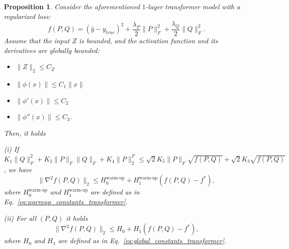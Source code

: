 \documentclass[a4paper,11pt]{article}
\newcommand{\1}{\mathbbm{1}}
\theoremstyle{plain}
\newtheorem{proposition}[theorem]{Proposition}
\begin{document}


\begin{proposition}
\label{prop:transformer_one_task}
    Consider the aforementioned $1$-layer transformer model with a regularized loss:
\begin{equation*}
    f(P,Q) = (\hat{y} - y_{true})^2 + \frac{\lambda_P}{2} \|P\|_F^2 + \frac{\lambda_Q}{2} \|Q\|_F^2.
\end{equation*}
Assume that the input $Z$ is bounded, and the activation function and its derivatives are globally bounded:
\begin{itemize}
    \item $\|Z\|_2 \leq C_Z$
    \item $\|\phi(x)\| \leq C_1 \|x\|$
    \item $\|\phi'(x)\| \leq C_2$
    \item $\|\phi''(x)\| \leq C_3$.
\end{itemize}
Then, it holds

(i) If $K_1 \|Q\|_F^2 + K_2 \|P\|_F \|Q\|_F + K_4 \|P\|_2^F \leq \sqrt{2} K_5 \|P\|_F \sqrt{f(P,Q)} + \sqrt{2} K_3 \sqrt{f(P,Q)}$, we have
\begin{equation*}
    \|\nabla^2 f(P,Q)\|_2 \leq H_0^{\text{warm-up}} + H_1^{\text{warm-up}} (f(P,Q)-f^*),
\end{equation*}
where $H_0^{\text{warm-up}}$ and $H_1^{\text{warm-up}}$ are defined as in Eq.~\eqref{eq:warmup_constants_transformer}.

(ii) For all $(P,Q)$ it holds
\begin{equation*}
    \|\nabla^2 f(P,Q)\|_2 \leq H_0 + H_1 (f(P,Q)-f^*),
\end{equation*}
where $H_0$ and $H_1$ are defined as in Eq.~\eqref{eq:global_constants_transformer}.    
\end{proposition}
\end{document}
